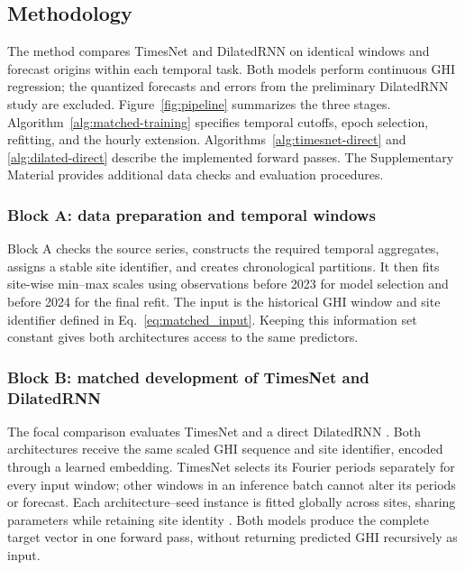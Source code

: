 \subsection{Methodology}
\label{sec:methodology}

The method compares TimesNet \cite{wu2023} and DilatedRNN \cite{chang2017}
on identical windows and forecast origins within each temporal task.
Both models perform continuous GHI regression; the quantized forecasts and
errors from the preliminary DilatedRNN study are excluded.
Figure~\ref{fig:pipeline} summarizes the three stages.
Algorithm~\ref{alg:matched-training} specifies temporal cutoffs, epoch
selection, refitting, and the hourly extension.
Algorithms~\ref{alg:timesnet-direct} and \ref{alg:dilated-direct} describe
the implemented forward passes. The Supplementary Material provides
additional data checks and evaluation procedures.



\subsubsection{Block A: data preparation and temporal windows}

Block A checks the source series, constructs the required temporal
aggregates, assigns a stable site identifier, and creates chronological
partitions. It then fits site-wise min--max scales using observations before
2023 for model selection and before 2024 for the final refit.
The input is the historical GHI window and site identifier defined in
Eq.~\eqref{eq:matched_input}. Keeping this information set constant gives
both architectures access to the same predictors.

\subsubsection{Block B: matched development of TimesNet and DilatedRNN}

The focal comparison evaluates TimesNet \cite{wu2023} and a direct
DilatedRNN \cite{chang2017}. Both architectures receive the same scaled GHI
sequence and site identifier, encoded through a learned embedding. TimesNet
selects its Fourier periods separately for every input window; other windows
in an inference batch cannot alter its periods or forecast. Each
architecture--seed instance is fitted globally across sites, sharing
parameters while retaining site identity \cite{montero2021}. Both models
produce the complete target vector in one forward pass, without returning
predicted GHI recursively as input.


